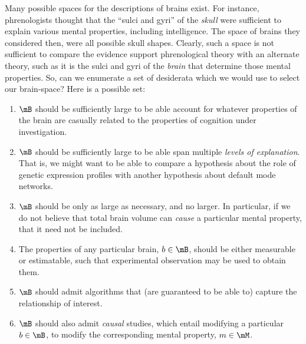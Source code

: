Many possible spaces for the descriptions of brains exist. For instance, phrenologists thought that the ``sulci and gyri'' of the \emph{skull} were sufficient to explain various mental properties, including intelligence. The space of brains they considered then, were all possible skull shapes. Clearly, such a space is not sufficient to compare the evidence support phrenological theory with an alternate theory, such as it is the sulci and gyri of the \emph{brain} that determine those mental properties. So, can we enumerate a set of desiderata which we would use to select our brain-space? Here is a possible set:
\begin{enumerate}
	\item $\mB$ should be sufficiently large to be able account for whatever properties of the brain are casually related to the properties of cognition under investigation. 
	\item $\mB$ should be sufficiently large to be able span multiple \emph{levels of explanation}. That is, we might want to be able to compare a hypothesis about the role of genetic expression profiles with another hypothesis about default mode networks. 
	\item $\mB$ should be only as large as necessary, and no larger. In particular, if we do not believe that total brain volume can \emph{cause} a particular mental property, that it need not be included. 
	\item The properties of any particular brain, $b\in \mB$, should be either measurable or estimatable, such that experimental observation may be used to obtain them.	%
	\item $\mB$ should admit algorithms that (are guaranteed to be able to) capture the relationship of interest. 
	\item $\mB$ should also admit \emph{causal} studies, which entail modifying a particular $b \in \mB$, to modify the corresponding mental property, $m \in \mM$. 
\end{enumerate}

